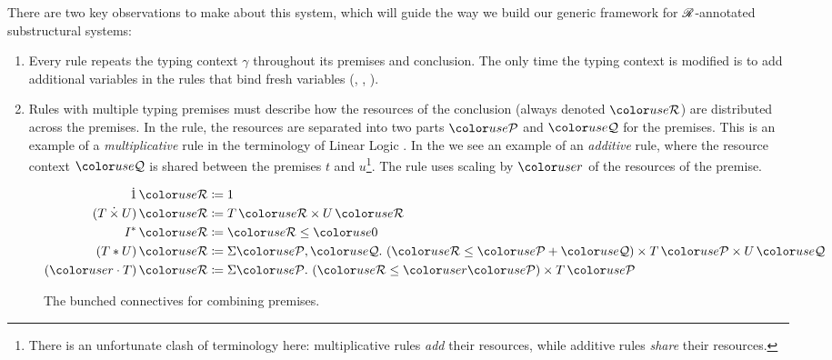 There are two key observations to make about this system, which will
guide the way we build our generic framework for $\mathscr R$-annotated
substructural systems:
\begin{enumerate}
\item Every rule repeats the typing context $\gamma$ throughout its
  premises and conclusion. The only time the typing context is
  modified is to add additional variables in the rules that bind fresh
  variables (,
  , ).
\item Rules with multiple typing premises must describe how the
  resources of the conclusion (always denoted $\grR$) are distributed
  across the premises. In the  rule, the
  resources are separated into two parts $\grP$ and $\grQ$ for the
  premises. This is an example of a \emph{multiplicative} rule in the
  terminology of Linear Logic \cite{girard87linear}. In the
   we see an example of an
  \emph{additive} rule, where the resource context $\grQ$ is shared
  between the premises $t$ and $u$\footnote{There is an unfortunate
    clash of terminology here: multiplicative rules \emph{add} their
    resources, while additive rules \emph{share} their
    resources.}. The  rule uses scaling
  by $\gr r$ of the resources of the premise.
\end{enumerate}

\begin{figure}
  \begin{align*}
    \dot1\,\grR &\coloneqq 1 \\
    (T \dottimes U)\,\grR &\coloneqq T\,\grR \times U\,\grR \\
    I^*\,\grR &\coloneqq \grR \leq \gr0 \\
    (T \sep U)\,\grR &\coloneqq \Sigma \grP,\grQ.~\plr{\grR \leq \grP + \grQ}
                       \times T\,\grP \times U\,\grQ \\
    (\gr r \cdot T)\,\grR &\coloneqq \Sigma \grP.~\plr{\grR \leq \gr r\grP}
                       \times T\,\grP \\
  \end{align*}
  \caption{The bunched connectives for combining premises.}
  \label{fig:bunched}
\end{figure}

